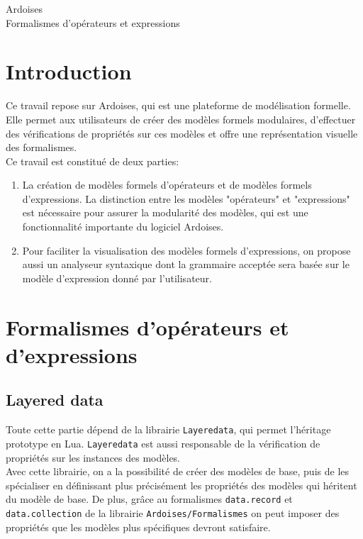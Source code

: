 \documentclass{article}
\begin{document}
\begin{center}
	\huge 
	Ardoises \\
	Formalismes d'opérateurs et expressions
\end{center}
\renewcommand{\contentsname}{Sommaire}
\tableofcontents
\newpage

\section{Introduction}
Ce travail repose sur Ardoises, %
qui est une plateforme de modélisation formelle. Elle permet aux utilisateurs de créer des modèles formels modulaires, d'effectuer des vérifications de propriétés sur ces modèles et offre une représentation visuelle des formalismes. \\

Ce travail est constitué de deux parties:
\begin{enumerate}
	\item La création de modèles formels d'opérateurs et de modèles formels d'expressions. La distinction entre les modèles "opérateurs" et "expressions" est nécessaire pour assurer la modularité des modèles, qui est une fonctionnalité importante du logiciel Ardoises.
	\item Pour faciliter la visualisation des modèles formels d'expressions, on propose aussi un analyseur syntaxique dont la grammaire acceptée sera basée sur le modèle d'expression donné par l'utilisateur.
\end{enumerate}

\section{Formalismes d'opérateurs et d'expressions}

\subsection{Layered data}
Toute cette partie dépend de la librairie \lstinline|Layeredata|, %
qui permet l'héritage prototype en Lua. \lstinline|Layeredata| est aussi responsable de la vérification de propriétés sur les instances des modèles. \\

\noindent Avec cette librairie, on a la possibilité de créer des modèles de base, puis de les spécialiser en définissant plus précisément les propriétés des modèles qui héritent du modèle de base. De plus, grâce au formalismes \lstinline|data.record| et \lstinline|data.collection| de la librairie \lstinline|Ardoises/Formalismes| on peut imposer des propriétés que les modèles plus spécifiques devront satisfaire.
\end{document}
